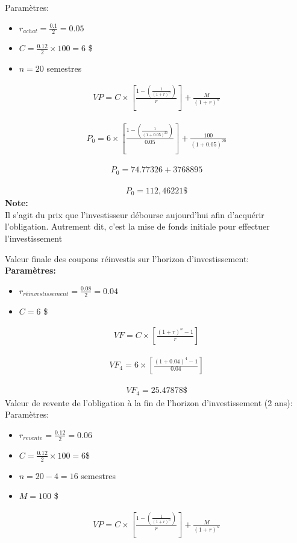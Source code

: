 \documentclass[10pt,a4paper]{article}
\begin{document}
Paramètres: 
\begin{itemize}
\item $r_{achat} = \frac{0.1}{2} = 0.05$
\item $C = \frac{0.12}{2} \times 100 =6$ \$
\item $n = 20$ semestres
\end{itemize}

\begin{align*}
VP=C \times \left[\frac{1-\left( \frac{1}{(1+r)^n}\right)}{r} \right] +\frac{M}{(1+r)^n}
\end{align*}

\begin{align*}
P_0=6 \times \left[\frac{1-\left( \frac{1}{(1+0.05)^{20}}\right)}{0.05} \right] +\frac{100}{(1+0.05)^{20}}
\end{align*}

\begin{align*}
P_0=74.77326+3768895
\end{align*}

\begin{align*}
P_0=112,46221 \$
\end{align*}
\textbf{Note:}\\ Il s'agit du prix que l'investisseur débourse aujourd'hui afin d'acquérir l'obligation.  Autrement dit, c'est la mise de fonds initiale pour effectuer l'investissement


\newpage

Valeur finale des coupons réinvestis sur l'horizon d'investissement: \\


\textbf{Paramètres:}
\begin{itemize}
\item $r_{réinvestissement} = \frac{0.08}{2} = 0.04$
\item $C =6$ \$
\end{itemize}

\begin{align*}
VF=C \times \left[ \frac{(1+r)^n-1}{r} \right]
\end{align*}

\begin{align*}
VF_4= 6 \times \left[ \frac{(1+0.04)^4-1}{0.04} \right]
\end{align*}

\begin{align*}
VF_4=25.47878\$
\end{align*}
Valeur de revente de l'obligation à la fin de l'horizon d'investissement (2 ans):\\
Paramètres: 
\begin{itemize}
\item $r_{revente} = \frac{0.12}{2} = 0.06$
\item $C = \frac{0.12}{2} \times 100=6$\$
\item $n=20-4=16$ semestres 
\item $M=100$ \$
\end{itemize}
\begin{align*}
VP=C \times \left[\frac{1-\left( \frac{1}{(1+r)^n}\right)}{r} \right] +\frac{M}{(1+r)^n}
\end{align*}
\end{document}
